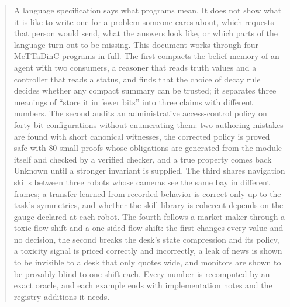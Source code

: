 \documentclass[11pt]{article}
\theoremstyle{definition}
\theoremstyle{plain}
\begin{document}
\begin{abstract}
\noindent
A language specification says what programs mean. It does not show what it is like to write one
for a problem someone cares about, which requests that person would send, what the answers look
like, or which parts of the language turn out to be missing. This document works through four
MeTTaDinC programs in full. The first compacts the belief memory of an agent with two consumers,
a reasoner that reads truth values and a controller that reads a status, and finds that the
choice of decay rule decides whether any compact summary can be trusted; it separates three
meanings of ``store it in fewer bits'' into three claims with different numbers. The second
audits an administrative access-control policy on forty-bit configurations without enumerating
them: two authoring mistakes are found with short canonical witnesses, the corrected policy is
proved safe with $80$ small proofs whose obligations are generated from the module itself and checked
by a verified checker, and a true property comes back Unknown until a stronger invariant is
supplied. The third shares navigation skills between three robots whose
cameras see the same bay in different frames; a transfer learned from recorded behavior is
correct only up to the task's symmetries, and whether the skill library is coherent depends on
the gauge declared at each robot. The fourth follows a market maker through a toxic-flow shift
and a one-sided-flow shift: the first changes every value and no decision, the second breaks the
desk's state compression and its policy, a toxicity signal is priced correctly and incorrectly,
a leak of news is shown to be invisible to a desk that only quotes wide, and monitors are shown
to be provably blind to one shift each. Every number is recomputed by an exact oracle, and each
example ends with implementation notes and the registry additions it needs.
\end{abstract}
\end{document}
